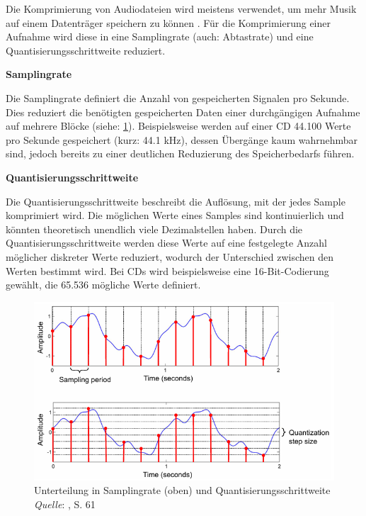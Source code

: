 Die Komprimierung von Audiodateien wird meistens verwendet, um mehr Musik auf einem Datenträger speichern zu können \parencite{what_is_audio_compression}. Für die Komprimierung einer Aufnahme wird diese in eine Samplingrate (auch: Abtastrate) und eine Quantisierungsschrittweite reduziert.

%
\textbf{Samplingrate}
%

Die Samplingrate definiert die Anzahl von gespeicherten Signalen pro Sekunde.
Dies reduziert die benötigten gespeicherten Daten einer durchgängigen Aufnahme auf mehrere Blöcke (siehe: \cref{fig:samplingrate}).
Beispielsweise werden auf einer CD 44.100 Werte pro Sekunde gespeichert (kurz: 44.1 kHz), dessen Übergänge kaum wahrnehmbar sind, jedoch bereits zu einer deutlichen Reduzierung des Speicherbedarfs führen.

%
\textbf{Quantisierungsschrittweite}
%

Die Quantisierungsschrittweite beschreibt die Auflösung, mit der jedes Sample komprimiert wird.
Die möglichen Werte eines Samples sind kontinuierlich und könnten theoretisch unendlich viele Dezimalstellen haben.
Durch die Quantisierungsschrittweite werden diese Werte auf eine festgelegte Anzahl möglicher diskreter Werte reduziert, wodurch der Unterschied zwischen den Werten bestimmt wird.
Bei CDs wird beispielsweise eine 16-Bit-Codierung gewählt, die 65.536 mögliche Werte definiert.

%
\begin{figure}[h]
    \includegraphics[width=1\textwidth]{images/Samplingrate_Quantisierungsgröße.PNG}
    \caption[Unterteilung in Samplingrate und Quantisierungsschrittweite]{Unterteilung in Samplingrate (oben) und Quantisierungsschrittweite\\\hspace{\textwidth}\textit{Quelle}: \cite{fundamentals_of_music_processing}, S. 61}
    \label{fig:samplingrate}
\end{figure}
%


